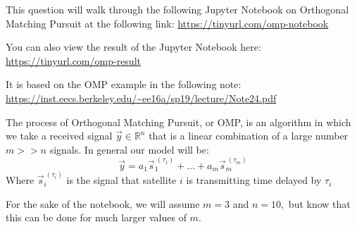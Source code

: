 

This question will walk through the following Jupyter Notebook on Orthogonal Matching Pursuit at the following link:
\url{https://tinyurl.com/omp-notebook}

You can also view the result of the Jupyter Notebook here:
\url{https://tinyurl.com/omp-result}

It is based on the OMP example in the following note: \\
 \url{https://inst.eecs.berkeley.edu/~ee16a/sp19/lecture/Note24.pdf}

The process of Orthogonal Matching Pursuit, or OMP, is an algorithm in which we take a received signal $\vec{y} \in \mathbb{R}^{n}$ that is a linear combination of a large number $m >> n$ signals. In general our model will be:
\begin{equation}
  \vec{y} = a_{1} \vec{s}_{1}^{\ (\tau_{1})} + \dotsc + a_{m} \vec{s}_{m}^{\ (\tau_{m})}
\end{equation}
Where $\vec{s}_{i}^{\ (\tau_{i})}$ is the signal that satellite $i$ is transmitting time delayed by $\tau_{i}$

For the sake of the notebook, we will assume $m = 3$ and $n = 10,$ but know that this can be done for much larger values of $m.$

